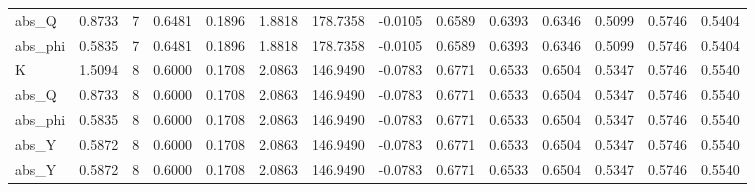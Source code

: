 \begin{tabular}{lrrrrrrrrrrrrr}
abs\_Q & 0.8733 & 7 & 0.6481 & 0.1896 & 1.8818 & 178.7358 & -0.0105 & 0.6589 & 0.6393 & 0.6346 & 0.5099 & 0.5746 & 0.5404 \\
abs\_phi & 0.5835 & 7 & 0.6481 & 0.1896 & 1.8818 & 178.7358 & -0.0105 & 0.6589 & 0.6393 & 0.6346 & 0.5099 & 0.5746 & 0.5404 \\
K & 1.5094 & 8 & 0.6000 & 0.1708 & 2.0863 & 146.9490 & -0.0783 & 0.6771 & 0.6533 & 0.6504 & 0.5347 & 0.5746 & 0.5540 \\
abs\_Q & 0.8733 & 8 & 0.6000 & 0.1708 & 2.0863 & 146.9490 & -0.0783 & 0.6771 & 0.6533 & 0.6504 & 0.5347 & 0.5746 & 0.5540 \\
abs\_phi & 0.5835 & 8 & 0.6000 & 0.1708 & 2.0863 & 146.9490 & -0.0783 & 0.6771 & 0.6533 & 0.6504 & 0.5347 & 0.5746 & 0.5540 \\
abs\_Y & 0.5872 & 8 & 0.6000 & 0.1708 & 2.0863 & 146.9490 & -0.0783 & 0.6771 & 0.6533 & 0.6504 & 0.5347 & 0.5746 & 0.5540 \\
abs\_Y & 0.5872 & 8 & 0.6000 & 0.1708 & 2.0863 & 146.9490 & -0.0783 & 0.6771 & 0.6533 & 0.6504 & 0.5347 & 0.5746 & 0.5540 \\
\bottomrule
\end{tabular}
